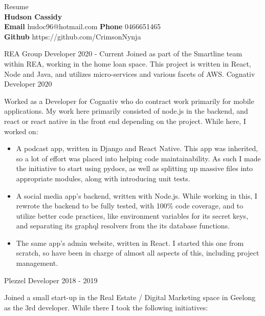 \documentclass[8pt]{developercv}
\begin{document}
	\begin{minipage}[a]{1.0\textwidth}
		\begin{center}	%
			{\HUGE Resume}\\
			\textbf {Hudson Cassidy} \\
			\textbf {Email} hudoc96@hotmail.com
			\textbf {Phone} 0466651465 \\
			\textbf {Github} https://github.com/CrimsonNynja \\
		\end{center}
	\end{minipage}
	\begin{minipage}[t]{0.7\textwidth}
		\begin{entrylist}	%
			\entry
				{REA Group}
				{Developer}
				{2020 - Current}
				{Joined as part of the Smartline team within REA, working in the home loan space. This project is written in React, Node and Java, and utilizes micro-services and various facets of AWS.}
			\entry
				{Cognativ}
				{Developer}
				{2020}
				{Worked as a Developer for Cognativ who do contract work primarily for mobile applications. My work here primarily consisted of node.js in the backend, and react or react native in the front end depending on the project.
				While here, I worked on:
				\begin{itemize}
					\item A podcast app, written in Django and React Native. This app was inherited, so a lot of effort was placed into helping code maintainability. As such I made the initiative to start using pydocs, as well as splitting up massive files into appropriate modules, along with introducing unit tests.
					\item A social media app's backend, written with Node.js. While working in this, I rewrote the backend to be fully tested, with 100\% code coverage, and to utilize better code practices, like environment variables for its secret keys, and separating its graphql resolvers from the its database functions.
					\item The same app's admin website, written in React. I started this one from scratch, so have been in charge of almost all aspects of this, including project management.
				\end{itemize}
				}
			\entry
				{Plezzel}
				{Developer}
				{2018 - 2019}
				{Joined a small start-up in the Real Estate / Digital Marketing space in Geelong as the 3rd developer. While there I took the following initiatives:
				\begin{itemize}

\end{itemize}}
\end{entrylist}
\end{minipage}
\end{document}
